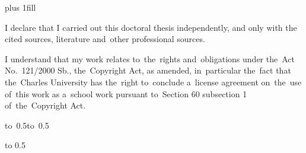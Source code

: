 \newpage



\openright
\hypersetup{pageanchor=true}
\pagestyle{plain}
\vglue 0pt plus 1fill

\noindent
I declare that I carried out this doctoral thesis independently, and only with the cited
sources, literature and~other professional sources.

\medskip\noindent
I understand that my work relates to~the~rights and~obligations under the~Act No.~121/2000 Sb.,
the~Copyright Act, as amended, in~particular the~fact that the~Charles
University has the~right to~conclude a~license agreement on~the~use of~this
work as a~school work pursuant to~Section 60 subsection 1 of~the~Copyright Act.

\vspace{10mm}

\hbox{\hbox to 0.5\hbox to 0.5}

\vspace{20mm}
\newpage


\openright

\noindent

\Dedication

\newpage


\openright

\vbox to 0.5

\newpage

\openright
\pagestyle{plain}
\setcounter{page}{1}
\clearpage{}


\tableofcontents

\clearpage{}

